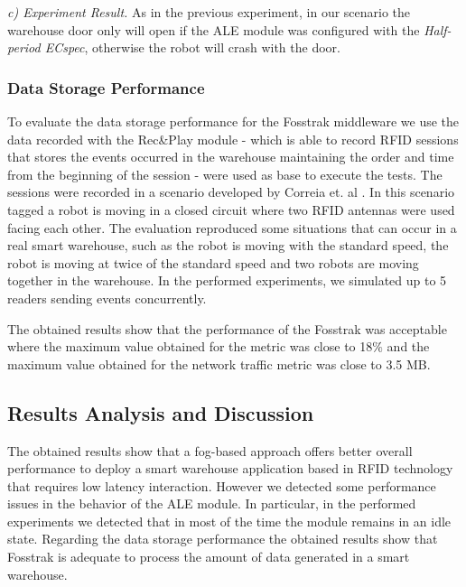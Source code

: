 \textit{c) Experiment Result.}
As in the previous experiment, in our scenario the warehouse door only will open if the \gls{ALE}
module was configured with the \textit{Half-period ECspec}, otherwise the robot will crash with
the door.

\subsubsection{Data Storage Performance}
\label{subs:data_storage_performance}
To evaluate the data storage performance for the Fosstrak middleware we use the data recorded with
the Rec\&Play module - which is able to record \gls{RFID} sessions that stores the events occurred
in the warehouse maintaining the order and time from the beginning of the session - were used as
base to execute the tests. The sessions were recorded in a scenario developed by Correia et. al \cite{Correia:Thesis:2014}.
In this scenario tagged a robot is moving in a closed circuit where two RFID antennas were used facing
each other. The evaluation reproduced some situations that can occur in a real smart warehouse,
such as the robot is moving with the standard speed, the robot is moving at twice of the standard
speed and two robots are moving together in the warehouse. In the performed experiments, we
simulated up to 5 readers sending events concurrently.

The obtained results show that the performance of the Fosstrak was acceptable where the maximum
value obtained for the  metric was close to 18$\%$ and the maximum
value obtained for the network traffic metric was close to 3.5 \gls{MB}.

\subsection{Results Analysis and Discussion}
\label{sub:results_analysis_discussion}
The obtained results show that a fog-based approach offers better overall performance to deploy a
smart warehouse application based in RFID technology that requires low latency interaction. However
we detected some performance issues in the behavior of the \gls{ALE} module. In particular, in the
performed experiments we detected that in most of the time the module remains in an idle state.
Regarding the data storage performance the obtained results show that Fosstrak is adequate
to process the amount of data generated in a smart warehouse.
